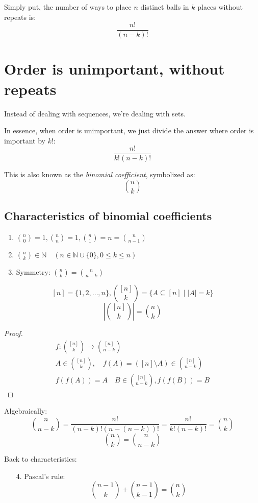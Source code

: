 \documentclass[00_complete]{subfiles}
\begin{document}
Simply put, the number of ways to place $n$ distinct balls in $k$ places
without repeats is:
$$\frac{n!}{(n-k)!}$$
\section{Order is unimportant, without repeats}

Instead of dealing with sequences, we're dealing with sets.

In essence, when order is unimportant, we just divide the answer where order is
important by $k!$:
$$
    \frac{n!}{k!(n-k)!}
$$

This is also known as the \emph{binomial coefficient}, symbolized as:
$$
    \binom{n}{k}
$$

\subsection{Characteristics of binomial coefficients}
\begin{enumerate}
    \item $\displaystyle \binom{n}{0} = 1, \binom{n}{n} = 1, \binom{n}{1} = n = \binom{n}{n-1}$
    \item $\displaystyle \binom{n}{k} \in \mathbb{N} \quad (n \in \mathbb{N}\cup\{0\}, 0 \leq k \leq
   n)$
    \item Symmetry: $\displaystyle \binom{n}{k} = \binom{n}{n-k}$
\end{enumerate}

\begin{symbols}
$$[n] = \{1,2, \dots, n\},
\binom{[n]}{k} = \{A \subseteq [n] \mid |A| = k \}$$
$$\left|\binom{[n]}{k}\right| = \binom{n}{k}$$
\end{symbols}

\begin{proof}
$$
\begin{gathered}
    f : \binom{[n]}{k} \to \binom{[n]}{n-k} \\
    A \in \binom{[n]}{k}, \quad f(A)=([n]\setminus A) \in \binom{[n]}{n-k} \\
    f(f(A)) = A \quad B \in \binom{[n]}{n-k}, f(f(B))=B
\end{gathered}
$$
\end{proof}

Algebraically:
$$\binom{n}{n-k} = \frac{n!}{(n-k)!(n-(n-k))!} = \frac{n!}{k!(n-k)!} =
\binom{n}{k}$$
$$\binom{n}{k}=\binom{n}{n-k}$$


Back to characteristics:
\begin{enumerate}
    \item[4.] Pascal's rule:
$$\binom{n-1}{k} + \binom{n-1}{k-1} = \binom{n}{k}$$
\end{enumerate}
\end{document}
